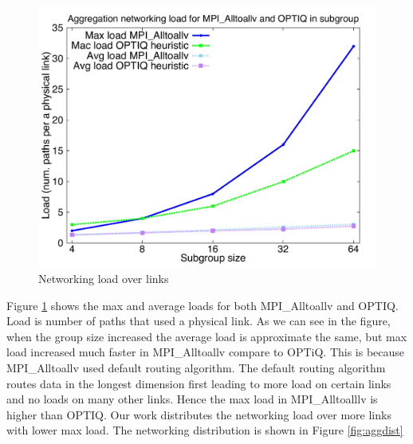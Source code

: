 \begin{figure}[!htb]
\vspace{-0.1in}
\centering
\includegraphics[scale=0.30]{figures/load.pdf}
\vspace{-0.1in}
\caption{Networking load over links}
\vspace{-0.1in}
\label{fig:aggload}
\end{figure}

Figure \ref{fig:aggload} shows the max and average loads for both MPI\_Alltoallv and OPTIQ. Load is number of paths that used a physical link. As we can see in the figure, when the group size increased the average load is approximate the same, but max load increased much faster in MPI\_Alltoallv compare to OPTiQ. This is because MPI\_Alltoallv used default routing algorithm. The default routing algorithm routes data in the longest dimension first leading to more load on certain links and no loads on many other links. Hence the max load in MPI\_Alltoalllv is higher than OPTIQ. Our work distributes the networking load over more links with lower max load. The networking distribution is shown in Figure \ref{fig:aggdist}

